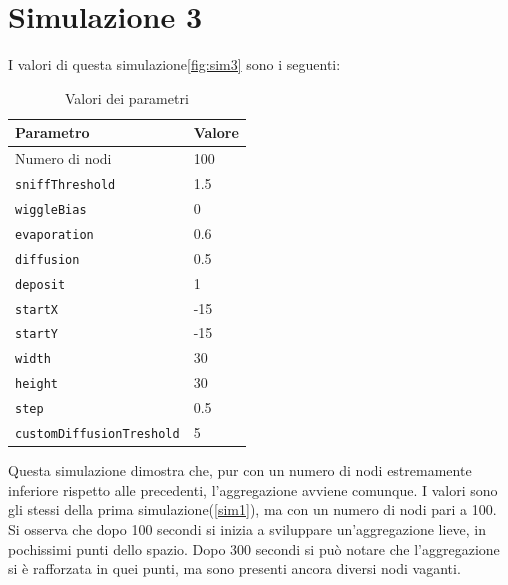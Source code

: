 \section{Simulazione 3}\label{sim3}
I valori di questa simulazione\space \cref{fig:sim3} sono i seguenti:
\begin{table}[ht]
    \centering
    \caption{Valori dei parametri}
    \begin{tabular}{ll}
        \toprule
        Parametro                   & Valore \\
        \midrule
        Numero di nodi              & 100    \\
        \texttt{sniffThreshold}     & 1.5    \\
        \texttt{wiggleBias}         & 0      \\
        \texttt{evaporation}        & 0.6    \\
        \texttt{diffusion}          & 0.5    \\
        \texttt{deposit}            & 1      \\
        \texttt{startX}             & -15    \\
        \texttt{startY}             & -15    \\
        \texttt{width}              & 30     \\
        \texttt{height}             & 30     \\
        \texttt{step}               & 0.5    \\
        \texttt{customDiffusionTreshold} & 5 \\
        \bottomrule
    \end{tabular}\label{tab:parametri3}
\end{table}\newline
Questa simulazione dimostra che, pur con un numero di nodi estremamente inferiore rispetto alle precedenti,
l'aggregazione avviene comunque. I valori sono gli stessi della prima simulazione\space(\cref{sim1}), ma con un numero di nodi pari a 100.
Si osserva che dopo 100 secondi si inizia a sviluppare un'aggregazione lieve, in pochissimi punti dello spazio.
Dopo 300 secondi si può notare che l'aggregazione si è rafforzata in quei punti, ma sono presenti ancora diversi nodi vaganti.


